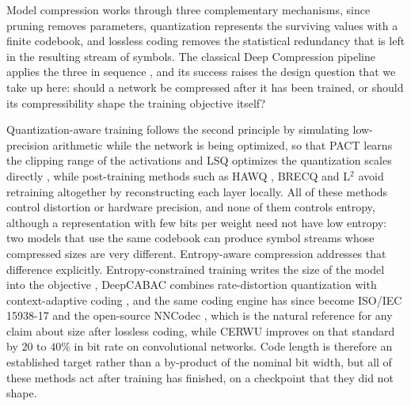 \documentclass{article}
\begin{document}
Model compression works through three complementary mechanisms, since pruning
removes parameters, quantization represents the surviving values with a finite
codebook, and lossless coding removes the statistical redundancy that is left in
the resulting stream of symbols. The classical Deep Compression pipeline applies
the three in sequence \citep{han2016deep}, and its success raises the design
question that we take up here: should a network be compressed after it has been
trained, or should its compressibility shape the training objective itself?

Quantization-aware training follows the second principle by simulating
low-precision arithmetic while the network is being optimized, so that PACT
learns the clipping range of the activations \citep{choi2018pact} and LSQ
optimizes the quantization scales directly \citep{esser2020lsq}, while
post-training methods such as HAWQ \citep{dong2019hawq}, BRECQ
\citep{li2021brecq} and L$^2$ \citep{shi2023l2} avoid retraining altogether by
reconstructing each layer locally. All of these methods control distortion or hardware precision, and none
of them controls entropy, although a representation with few bits per weight
need not have low entropy: two models that use the same codebook can produce
symbol streams whose compressed sizes are very different. Entropy-aware
compression addresses that difference explicitly. Entropy-constrained training
writes the size of the model into the objective \citep{wiedemann2018entropy},
DeepCABAC combines rate-distortion quantization with context-adaptive coding
\citep{wiedemann2019deepcabac}, and the same coding engine has since become
ISO/IEC 15938-17 and the open-source NNCodec \citep{becking2023nncodec}, which is
the natural reference for any claim about size after lossless coding, while CERWU
\citep{conzelmann2025rate} improves on that standard by $20$ to $40\%$ in bit rate
on convolutional networks. Code length is therefore an established target rather
than a by-product of the nominal bit width, but all of these methods act after
training has finished, on a checkpoint that they did not shape.
\end{document}
